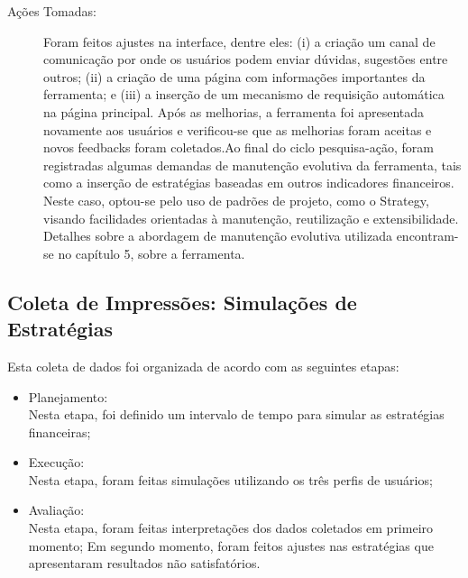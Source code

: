 \begin{description}
\item[Ações Tomadas:]

Foram feitos ajustes na interface, dentre eles: (i) a criação um canal de comunicação por onde os usuários podem enviar dúvidas, sugestões entre outros; (ii) a criação de uma página com informações importantes da ferramenta; e (iii) a inserção de um mecanismo de requisição automática na página principal. Após as melhorias, a ferramenta foi apresentada novamente aos usuários e verificou-se que as melhorias foram aceitas e novos feedbacks foram coletados.Ao final do ciclo pesquisa-ação, foram registradas algumas demandas de manutenção evolutiva da ferramenta, tais como a inserção de estratégias baseadas em outros indicadores financeiros. Neste caso, optou-se pelo uso de padrões de projeto, como o Strategy, visando facilidades orientadas à manutenção, reutilização e extensibilidade. Detalhes sobre a abordagem de manutenção evolutiva utilizada encontram-se no capítulo 5, sobre a ferramenta. 

\end{description}

\subsection{Coleta de Impressões: Simulações de Estratégias}

Esta coleta de dados foi organizada de acordo com as seguintes etapas:
\begin{itemize}
\item Planejamento:\\
Nesta etapa, foi definido um intervalo de tempo para simular as estratégias financeiras;
\item Execução:\\
Nesta etapa, foram feitas simulações utilizando os três perfis de usuários;
\item Avaliação:\\
Nesta etapa, foram feitas interpretações dos dados coletados em primeiro momento; Em segundo momento, foram feitos ajustes nas estratégias que apresentaram resultados não satisfatórios.
\end{itemize}

